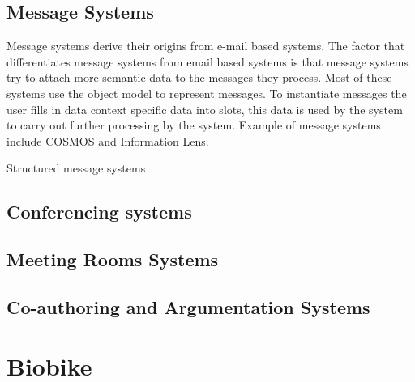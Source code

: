 \subsection{Message Systems}

Message systems derive their origins from e-mail based systems. The
factor that differentiates message systems from email based systems is
that message systems try to attach more semantic data to the messages
they process. Most of these systems use the object model to represent
messages. To instantiate messages the user fills in data context
specific data into slots, this data is used by the system to carry out
further processing by the system. Example of message systems include
COSMOS\cite{conf/cscw/BowersC88} and Information Lens\cite{Malo87a}. 

Structured message systems 


\subsection{Conferencing systems}

\subsection{Meeting Rooms Systems}

\subsection{Co-authoring and Argumentation Systems}

\section{Biobike}













